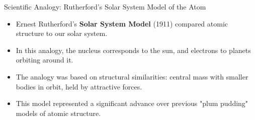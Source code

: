 \documentclass{beamer}
\begin{document}
\begin{frame}{Scientific Analogy: Rutherford's Solar System Model of the Atom}
	\begin{itemize}
		\item Ernest Rutherford's \textbf{Solar System Model} (1911) compared atomic structure to our solar system.
		\item In this analogy, the nucleus corresponds to the sun, and electrons to planets orbiting around it.
		\item The analogy was based on structural similarities: central mass with smaller bodies in orbit, held by attractive forces.
		\item This model represented a significant advance over previous "plum pudding" models of atomic structure.
	\end{itemize}
	
	\begin{center}
	\end{center}
\end{frame}
\end{document}
